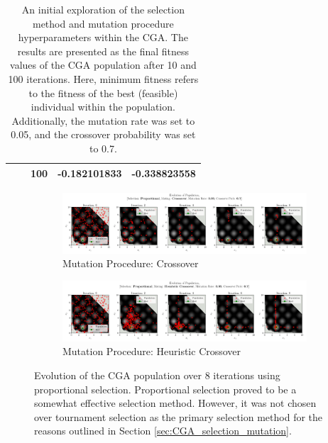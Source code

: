 \documentclass[10pt]{article}
\begin{document}
\begin{table}[H]
\begin{tabular}{|*{5}{c|}}
        & &\cellcolor{lightgray} 100 &\cellcolor{lightgray} -0.182101833 &\cellcolor{lightgray} -0.338823558 \\
        \hline
    \end{tabular}
    \captionsetup{justification=centering}
    \caption{An initial exploration of the selection method and mutation procedure hyperparameters within the CGA. The results are presented as the final fitness values of the CGA population after 10 and 100 iterations. Here, minimum fitness refers to the fitness of the best (feasible) individual within the population. Additionally, the mutation rate was set to 0.05, and the crossover probability was set to 0.7.}
    \label{tab:CGAexploration}
\end{table}

\begin{figure}[H]
    \centering
    \begin{subfigure}{0.85\textwidth}
        \centering
        \includegraphics[width=\textwidth]{../figures/KBF/10_iters/Proportional/Crossover/0.05_0.7_Population.png}
        \caption{Mutation Procedure: Crossover}
        \label{fig:CGA_flowchart_proportional_crossover}
    \end{subfigure}
    \begin{subfigure}{0.85\textwidth}
        \centering
        \includegraphics[width=\textwidth]{../figures/KBF/10_iters/Proportional/Heuristic Crossover/0.05_0.7_Population.png}
        \caption{Mutation Procedure: Heuristic Crossover}
        \label{fig:CGA_flowchart_proportional_Heuristic Crossover}
    \end{subfigure}
    \captionsetup{justification=centering}
    \caption{Evolution of the CGA population over 8 iterations using proportional selection. Proportional selection proved to be a somewhat effective selection method. However, it was not chosen over tournament selection as the primary selection method for the reasons outlined in Section \ref{sec:CGA_selection_mutation}.}
    \label{fig:CGA_flowchart_proportional}
\end{figure}
\end{document}
